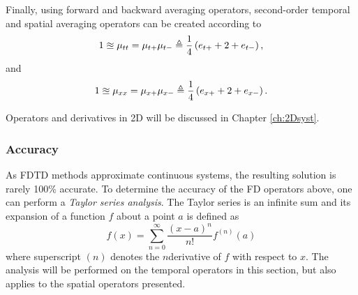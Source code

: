 Finally, using forward and backward averaging operators, second-order temporal and spatial averaging operators can be created according to
\begin{equation}
    1 \approxeq \mu_{tt} = \mu_{t+}\mu_{t-} \triangleq \frac{1}{4}\left(e_{t+}+2+e_{t-}\right),
\end{equation}
and
\begin{equation}
    1 \approxeq \mu_{xx} = \mu_{x+}\mu_{x-} \triangleq \frac{1}{4}\left(e_{x+}+2+e_{x-}\right).
\end{equation}

Operators and derivatives in 2D will be discussed in Chapter \ref{ch:2Dsyst}.


\subsubsection{Accuracy}
As FDTD methods approximate continuous systems, the resulting solution is rarely 100\% accurate. To determine the accuracy of the FD operators above, one can perform a \textit{Taylor series analysis}. The Taylor series is an infinite sum and its expansion of a function $f$ about a point $a$ is defined as
\begin{equation}
    f(x) = \sum_{n=0}^{\infty} \frac{(x-a)^n}{n!}f^{(n)}(a)
\end{equation}
where superscript $(n)$ denotes the $n$\th derivative of $f$ with respect to $x$. The analysis will be performed on the temporal operators in this section, but also applies to the spatial operators presented.

